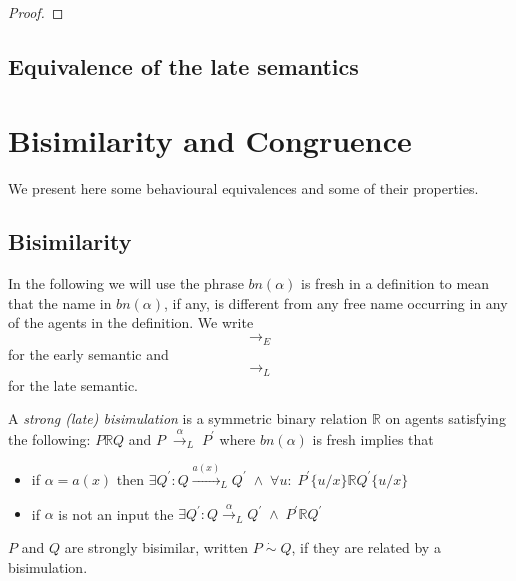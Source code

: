 \begin{theorem}
\begin{proof}
% 
% 
% 
  \end{proof}
\end{theorem}



\subsection{Equivalence of the late semantics}


\section{Bisimilarity and Congruence}

We present here some behavioural equivalences and some of their properties. 

\subsection{Bisimilarity}
In the following we will use the phrase $bn(\alpha)$ is fresh in a definition to mean that the name in $bn(\alpha)$, if any, is different from any free name occurring in any of the agents in the definition. We write 
\[
  \rightarrow_{E}
\]
for the early semantic and 
\[
  \rightarrow_{L}
\]
for the late semantic.

\begin{definition}
  A \emph{strong (late) bisimulation} is a symmetric binary relation $\mathbb{R}$ on agents satisfying the following: $P\mathbb{R} Q$ and $P\; \xrightarrow{\alpha}_{L}\; P^{'}$ where $bn(\alpha)$ is fresh implies that
  \begin{itemize}
    \item
      if $\alpha=a(x)$ then $\exists Q^{'}: Q\xrightarrow{a(x)}_{L}Q^{'}\; \wedge\; \forall u:\; P^{'}\{u/x\}\mathbb{R}Q^{'}\{u/x\}$
    \item
      if $\alpha$ is not an input the $\exists Q^{'}: Q\xrightarrow{\alpha}_{L}Q^{'}\; \wedge\; P^{'}\mathbb{R}Q^{'}$
  \end{itemize}
  $P$ and $Q$ are strongly bisimilar, written $P\; \dot{\sim}\; Q$, if they are related by a bisimulation. 
\end{definition}

